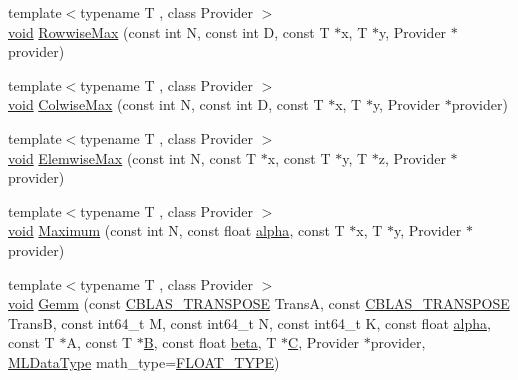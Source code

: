 \begin{DoxyCompactItemize}
\item 
{\footnotesize template$<$typename T , class Provider $>$ }\\\mbox{\hyperlink{mlasi_8h_a88f941d423cb2a819b70a1358982b1a6}{void}} \mbox{\hyperlink{namespaceonnxruntime_1_1math_a14e1e8d9851a45b734793f3424949e35}{Rowwise\+Max}} (const int N, const int D, const T $\ast$x, T $\ast$y, Provider $\ast$provider)
\item 
{\footnotesize template$<$typename T , class Provider $>$ }\\\mbox{\hyperlink{mlasi_8h_a88f941d423cb2a819b70a1358982b1a6}{void}} \mbox{\hyperlink{namespaceonnxruntime_1_1math_a263543a2844b61ba091ad8d0e341557f}{Colwise\+Max}} (const int N, const int D, const T $\ast$x, T $\ast$y, Provider $\ast$provider)
\item 
{\footnotesize template$<$typename T , class Provider $>$ }\\\mbox{\hyperlink{mlasi_8h_a88f941d423cb2a819b70a1358982b1a6}{void}} \mbox{\hyperlink{namespaceonnxruntime_1_1math_a708dfaff226b182c1f1ec2ed849fafa6}{Elemwise\+Max}} (const int N, const T $\ast$x, const T $\ast$y, T $\ast$z, Provider $\ast$provider)
\item 
{\footnotesize template$<$typename T , class Provider $>$ }\\\mbox{\hyperlink{mlasi_8h_a88f941d423cb2a819b70a1358982b1a6}{void}} \mbox{\hyperlink{namespaceonnxruntime_1_1math_a3b2c3754c68e1540d57d6dd2ad3c73ca}{Maximum}} (const int N, const float \mbox{\hyperlink{mlasi_8h_a1763355f32e1812e5cb3a0080e7cca12}{alpha}}, const T $\ast$x, T $\ast$y, Provider $\ast$provider)
\item 
{\footnotesize template$<$typename T , class Provider $>$ }\\\mbox{\hyperlink{mlasi_8h_a88f941d423cb2a819b70a1358982b1a6}{void}} \mbox{\hyperlink{namespaceonnxruntime_1_1math_a30950f751444e202fe4976dda70cc1fe}{Gemm}} (const \mbox{\hyperlink{cblas_8h_a44dfaddb823648755b110dbad849c5a9}{C\+B\+L\+A\+S\+\_\+\+T\+R\+A\+N\+S\+P\+O\+SE}} TransA, const \mbox{\hyperlink{cblas_8h_a44dfaddb823648755b110dbad849c5a9}{C\+B\+L\+A\+S\+\_\+\+T\+R\+A\+N\+S\+P\+O\+SE}} TransB, const int64\+\_\+t M, const int64\+\_\+t N, const int64\+\_\+t K, const float \mbox{\hyperlink{mlasi_8h_a1763355f32e1812e5cb3a0080e7cca12}{alpha}}, const T $\ast$A, const T $\ast$\mbox{\hyperlink{mlasi_8h_a472f4360dfbf830e5135980ff43484b9}{B}}, const float \mbox{\hyperlink{mlasi_8h_a5fd37d216981b4cd9a19e29b5acd48d4}{beta}}, T $\ast$\mbox{\hyperlink{mlasi_8h_a5693f8b3559ce97985de5239fdcf6006}{C}}, Provider $\ast$provider, \mbox{\hyperlink{namespaceonnxruntime_ad77d0a6e838ec7da5dc35fed5ee66b49}{M\+L\+Data\+Type}} math\+\_\+type=\mbox{\hyperlink{math_8h_a41cf4177f569cb6b87ec5c90c0165769}{F\+L\+O\+A\+T\+\_\+\+T\+Y\+PE}})

\end{DoxyCompactItemize}
